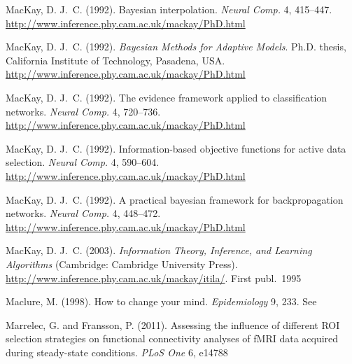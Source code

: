 \documentclass[%
]{frontiersSCNS-nologo} %
\newcommand*{\citebi}[2][]{\citet[#1]{#2}%
}
\renewcommand*{\|}{\mathpunct{|}}%
\begin{document}
\begin{thebibliography}{156}
MacKay, D. J.~C. (1992{}).
\newblock Bayesian interpolation.
\newblock \emph{Neural Comp.} 4, 415--447.
\newblock \url{http://www.inference.phy.cam.ac.uk/mackay/PhD.html}

MacKay, D. J.~C. (1992{}).
\newblock \emph{Bayesian Methods for Adaptive Models}.
\newblock Ph.D. thesis, California Institute of Technology, Pasadena, USA.
\newblock \url{http://www.inference.phy.cam.ac.uk/mackay/PhD.html}

MacKay, D. J.~C. (1992{}).
\newblock The evidence framework applied to classification networks.
\newblock \emph{Neural Comp.} 4, 720--736.
\newblock \url{http://www.inference.phy.cam.ac.uk/mackay/PhD.html}

MacKay, D. J.~C. (1992{}).
\newblock Information-based objective functions for active data selection.
\newblock \emph{Neural Comp.} 4, 590--604.
\newblock \url{http://www.inference.phy.cam.ac.uk/mackay/PhD.html}

MacKay, D. J.~C. (1992{}).
\newblock A practical bayesian framework for backpropagation networks.
\newblock \emph{Neural Comp.} 4, 448--472.
\newblock \url{http://www.inference.phy.cam.ac.uk/mackay/PhD.html}

MacKay, D. J.~C. (2003).
\newblock \emph{Information Theory, Inference, and Learning Algorithms}
  (Cambridge: Cambridge University Press).
\newblock \url{http://www.inference.phy.cam.ac.uk/mackay/itila/}. First publ.\
  1995

Maclure, M. (1998).
\newblock How to change your mind.
\newblock \emph{Epidemiology} 9, 233.
\newblock See \citebi{greenland1998}

Marrelec, G. and Fransson, P. (2011).
\newblock Assessing the influence of different {ROI} selection strategies on
  functional connectivity analyses of {fMRI} data acquired during steady-state
  conditions.
\newblock \emph{PLoS One} 6, e14788


\end{thebibliography}
\end{document}
